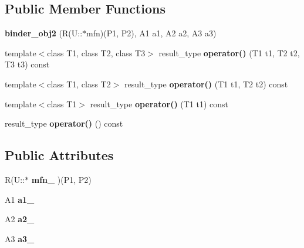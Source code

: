 \subsection*{Public Member Functions}
\begin{CompactItemize}
\item 
\textbf{binder\_\-obj2} (R(U::$\ast$mfn)(P1, P2), A1 a1, A2 a2, A3 a3)\label{structam_1_1lambda_1_1binder__obj2_b6c3d3cf87cf2043109bb3ffc50600f8}

\item 
template$<$class T1, class T2, class T3$>$ result\_\-type \textbf{operator()} (T1 t1, T2 t2, T3 t3) const \label{structam_1_1lambda_1_1binder__obj2_85f7162e6770a724fd7df21942d0db12}

\item 
template$<$class T1, class T2$>$ result\_\-type \textbf{operator()} (T1 t1, T2 t2) const\label{structam_1_1lambda_1_1binder__obj2_728524865a5534c28313682ca84a37cb}

\item 
template$<$class T1$>$ result\_\-type \textbf{operator()} (T1 t1) const \label{structam_1_1lambda_1_1binder__obj2_e24884808c9326ecea0ebbf01ad38433}

\item 
result\_\-type \textbf{operator()} () const\label{structam_1_1lambda_1_1binder__obj2_46d82ba146ffb7b2078ff54f5cd73864}

\end{CompactItemize}
\subsection*{Public Attributes}
\begin{CompactItemize}
\item 
R(U::$\ast$ \textbf{mfn\_\-} )(P1, P2)\label{structam_1_1lambda_1_1binder__obj2_e7121c748bbacb92001963df40d011c6}

\item 
A1 \textbf{a1\_\-}\label{structam_1_1lambda_1_1binder__obj2_33d2936d64731df2deb1ed60a5f41460}

\item 
A2 \textbf{a2\_\-}\label{structam_1_1lambda_1_1binder__obj2_e8126415b8f3afaa65ea1c03dbe16c2b}

\item 
A3 \textbf{a3\_\-}\label{structam_1_1lambda_1_1binder__obj2_e23e6873967450ae98681211bff38a3d}

\end{CompactItemize}


